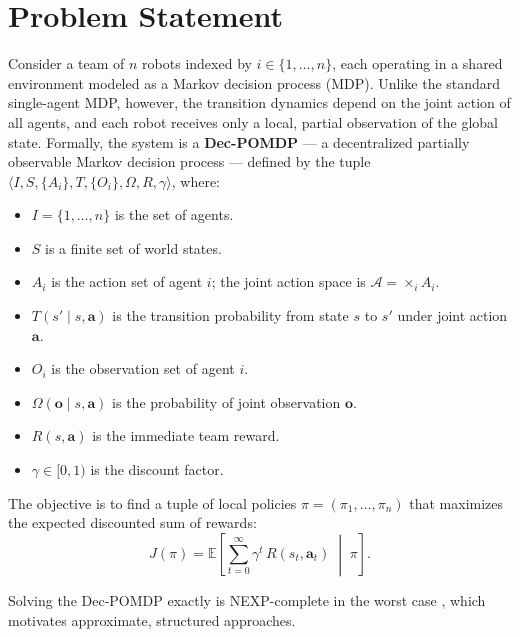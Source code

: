 \section{Problem Statement}

Consider a team of $n$ robots indexed by $i \in \{1, \ldots, n\}$, each operating
in a shared environment modeled as a Markov decision process (MDP). Unlike the
standard single-agent MDP, however, the transition dynamics depend on the joint
action of all agents, and each robot receives only a local, partial observation
of the global state. Formally, the system is a \textbf{Dec-POMDP} --- a
decentralized partially observable Markov decision process --- defined by the tuple
$\langle I, S, \{A_i\}, T, \{O_i\}, \Omega, R, \gamma \rangle$, where:

\vspace{6pt}
\begin{tcolorbox}[
  colback=jhulight,
  colframe=jhublue,
  arc=4pt,
  boxrule=0.8pt,
  left=16pt,
  right=16pt,
  top=10pt,
  bottom=10pt
]
\vspace{-4pt}
\begin{itemize}[leftmargin=*,itemsep=3pt,topsep=0pt]
  \item $I = \{1, \ldots, n\}$ is the set of agents.
  \item $S$ is a finite set of world states.
  \item $A_i$ is the action set of agent $i$; the joint action space is $\mathcal{A} = \times_i A_i$.
  \item $T(s' \mid s, \mathbf{a})$ is the transition probability from state $s$ to $s'$ under joint action $\mathbf{a}$.
  \item $O_i$ is the observation set of agent $i$.
  \item $\Omega(\mathbf{o} \mid s, \mathbf{a})$ is the probability of joint observation $\mathbf{o}$.
  \item $R(s, \mathbf{a})$ is the immediate team reward.
  \item $\gamma \in [0, 1)$ is the discount factor.
\end{itemize}
\vspace{-4pt}
\end{tcolorbox}
\vspace{6pt}

The objective is to find a tuple of local policies $\pi = (\pi_1, \ldots, \pi_n)$
that maximizes the expected discounted sum of rewards:
\begin{equation}
  J(\pi) = \mathbb{E}\left[ \sum_{t=0}^{\infty} \gamma^t \, R(s_t, \mathbf{a}_t) \;\middle|\; \pi \right].
  \label{eq:objective}
\end{equation}

Solving the Dec-POMDP exactly is NEXP-complete in the worst case
\citep{bernstein2002complexity}, which motivates approximate, structured approaches.
